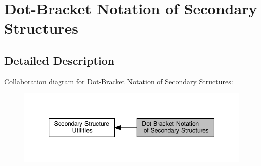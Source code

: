 \hypertarget{group__struct__utils__dot__bracket}{}\section{Dot-\/\+Bracket Notation of Secondary Structures}
\label{group__struct__utils__dot__bracket}


\subsection{Detailed Description}
Collaboration diagram for Dot-\/\+Bracket Notation of Secondary Structures\+:
\nopagebreak
\begin{figure}[H]
\begin{center}
\leavevmode
\includegraphics[width=347pt]{group__struct__utils__dot__bracket}
\end{center}
\end{figure}
